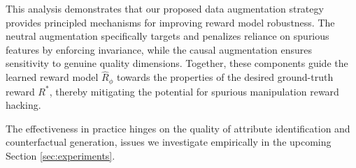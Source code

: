 This analysis demonstrates that our proposed data augmentation strategy provides principled mechanisms for improving reward model robustness. The neutral augmentation specifically targets and penalizes reliance on spurious features by enforcing invariance, while the causal augmentation ensures sensitivity to genuine quality dimensions. Together, these components guide the learned reward model $\hat{R}_\phi$ towards the properties of the desired ground-truth reward $R^*$, thereby mitigating the potential for spurious manipulation reward hacking. 

\begin{rem}
The effectiveness in practice hinges on the quality of attribute identification and counterfactual generation, issues we investigate empirically in the upcoming Section \ref{sec:experiments}.    
\end{rem}


